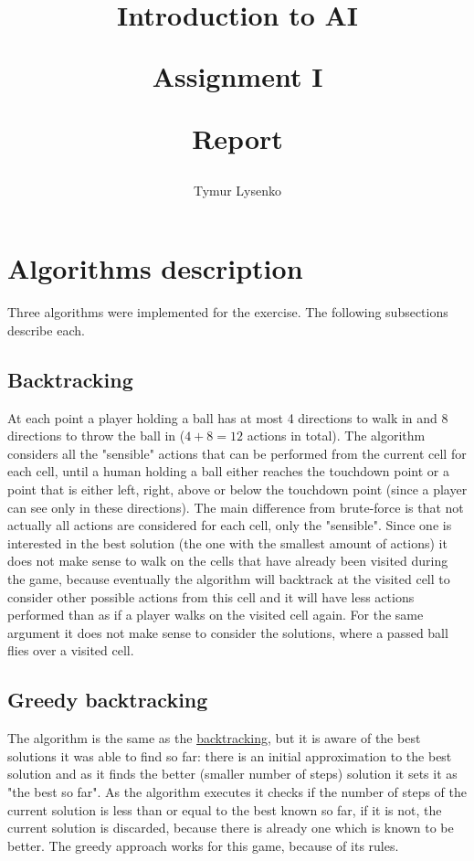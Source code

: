 \documentclass[a4paper, oneside, titlepage]{article}
\title{
    \textbf{Introduction to AI}

    Assignment I

    Report
}
\author{Tymur Lysenko}
\date{}
\begin{document}
\maketitle


\section{Algorithms description} \label{sec:algorithms_description}

Three algorithms were implemented for the exercise. The following subsections describe each.

\subsection{Backtracking} \label{sec:alg:backtracking}
At each point a player holding a ball has at most 4 directions to walk in and 8 directions to throw the ball in ($4 + 8 = 12$ actions in total). The algorithm considers all the "sensible" actions that can be performed from the current cell for each cell, until a human holding a ball either reaches the touchdown point or a point that is either left, right, above or below the touchdown point (since a player can see only in these directions). The main difference from brute-force is that not actually all actions are considered for each cell, only the "sensible". Since one is interested in the best solution (the one with the smallest amount of actions) it does not make sense to walk on the cells that have already been visited during the game, because eventually the algorithm will backtrack at the visited cell to consider other possible actions from this cell and it will have less actions performed than as if a player walks on the visited cell again. For the same argument it does not make sense to consider the solutions, where a passed ball flies over a visited cell.

\subsection{Greedy backtracking} \label{sec:alg:greedy_backtracking}
The algorithm is the same as the \hyperref[sec:alg:backtracking]{backtracking}, but it is aware of the best solutions it was able to find so far: there is an initial approximation to the best solution and as it finds the better (smaller number of steps) solution it sets it as "the best so far". As the algorithm executes it checks if the number of steps of the current solution is less than or equal to the best known so far, if it is not, the current solution is discarded, because there is already one which is known to be better. The greedy approach works for this game, because of its rules.
\end{document}

